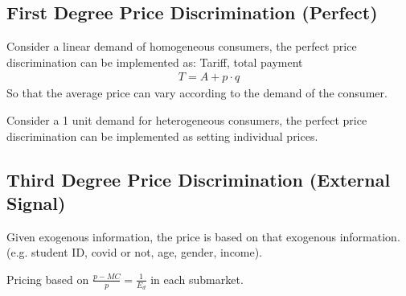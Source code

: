 \documentclass[11pt]{elegantbook}
\begin{document}
\subsection{First Degree Price Discrimination (Perfect)}
Consider a linear demand of homogeneous consumers, the perfect price discrimination can be implemented as:
Tariff, total payment
\begin{equation}
    \begin{aligned}
        T=A+p\cdot q
    \end{aligned}
    \nonumber
\end{equation}
So that the average price can vary according to the demand of the consumer.

Consider a 1 unit demand for heterogeneous consumers, the perfect price discrimination can be implemented as setting individual prices.


\subsection{Third Degree Price Discrimination (External Signal)}
Given exogenous information, the price is based on that exogenous information. (e.g. student ID, covid or not, age, gender, income).

Pricing based on $\frac{p-MC}{p}=\frac{1}{E_d}$ in each submarket.
\end{document}
